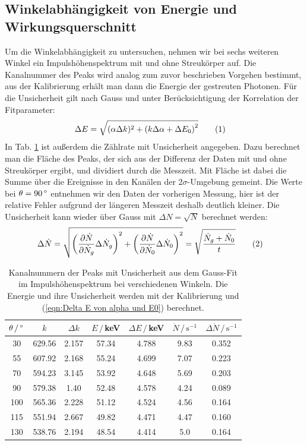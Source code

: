 \documentclass[german, parskip=full]{scrartcl}
\newcommand\numberthis{\addtocounter{equation}{1}\tag{\theequation}}
\newcommand{\kla}{}
\newcommand{\tecxt}{}
\begin{document}
\subsection{Winkelabhängigkeit von Energie und Wirkungsquerschnitt}
Um die Winkelabhängigkeit zu untersuchen, nehmen wir bei sechs weiteren Winkel ein Impulshöhenspektrum mit und ohne Streukörper auf. Die Kanalnummer des Peaks wird analog zum zuvor beschrieben Vorgehen bestimmt, aus der Kalibrierung erhält man dann die Energie der gestreuten Photonen. Für die Unsicherheit gilt nach Gauss und unter Berücksichtigung der Korrelation der Fitparameter:
\begin{align*}
\Delta E&=\sqrt{(\alpha\Delta k)^2+\kla\left( {k\Delta\alpha + \Delta E_0} \right)^2}\numberthis\label{eqn:Delta E von alpha und E0}
\end{align*}
In Tab. \ref{table:Winkelabhaenigkeit} ist außerdem die Zählrate mit Unsicherheit angegeben. Dazu berechnet man die Fläche des Peaks, der sich aus der Differenz der Daten mit und ohne Streukörper ergibt, und dividiert durch die Messzeit. Mit Fläche ist dabei die Summe über die Ereignisse in den Kanälen der $2\sigma$-Umgebung gemeint. Die Werte bei $\theta=90\,\degree$ entnehmen wir den Daten der vorherigen Messung, hier ist der relative Fehler aufgrund der längeren Messzeit deshalb deutlich kleiner. Die Unsicherheit kann wieder über Gauss mit $\Delta N=\sqrt{N}$ berechnet werden:
\begin{align*}
\Delta\dot{N}&=\sqrt{\kla\left( {\frac{\partial\dot{N}}{\partial\dot{N}_g}\Delta\dot{N}_g} \right)^2+\kla\left( {\frac{\partial\dot{N}}{\partial\dot{N}_0}\Delta\dot{N}_0} \right)^2}=\sqrt{\frac{\dot{N}_g+\dot{N}_0}{t}}\numberthis\label{eqn:Delta dot N von t}
\end{align*} 
\begin{table}[h!]
\centering
\begin{tabular}{c|c|c|c|c|c|c}
$\theta\,/\,\degree$&$k$&$\Delta k$&$E\,/\,$keV&$\Delta E\,/\,$keV&$\dot{N}\,/\,\tecxt\text{s}^{-1}$&$\Delta\dot{N}\,/\,\tecxt\text{s}^{-1}$\\ \hline
30 & 629.56 & 2.157 & 57.34 & 4.788 & 9.83 & 0.352\\ \hline
55 & 607.92 & 2.168 & 55.24 & 4.699 & 7.07 & 0.223\\ \hline
70 & 594.23 & 3.145 & 53.92 & 4.648 & 5.69 & 0.203\\ \hline
90 & 579.38 & 1.40 & 52.48 & 4.578 & 4.24 & 0.089\\ \hline
100 & 565.36 & 2.228 & 51.12 & 4.524 & 4.56 & 0.164\\ \hline
115 & 551.94 & 2.667 & 49.82 & 4.471 & 4.47 & 0.160\\ \hline
130 & 538.76 & 2.194 & 48.54 & 4.414 & 5.0 & 0.164\\
\end{tabular}
\caption{Kanalnummern der Peaks mit Unsicherheit aus dem Gauss-Fit im Impulshöhenspektrum bei verschiedenen Winkeln. Die Energie und ihre Unsicherheit werden mit der Kalibrierung und (\ref{eqn:Delta E von alpha und E0}) berechnet.}
\label{table:Winkelabhaenigkeit}
\end{table}\\
\end{document}
